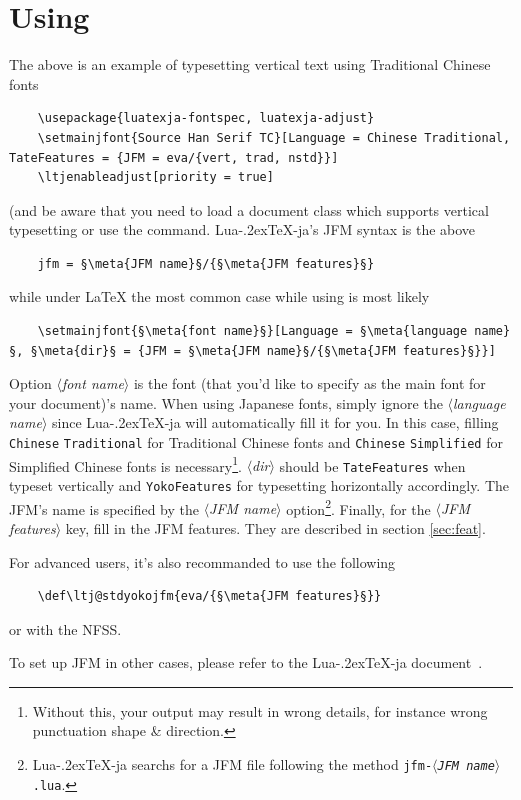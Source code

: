 \documentclass[twoside]{article}
\def\meta#1{{\normalfont\rmfamily\itshape$\langle$#1\/$\rangle$}}
\def\LuaTeX{Lua\kern-.2ex\TeX}
\begin{document}
\section{Using}
The above is an example of typesetting vertical text using Traditional Chinese fonts
\begin{lstlisting}
    \usepackage{luatexja-fontspec, luatexja-adjust}
    \setmainjfont{Source Han Serif TC}[Language = Chinese Traditional, TateFeatures = {JFM = eva/{vert, trad, nstd}}]
    \ltjenableadjust[priority = true]
\end{lstlisting}
(and be aware that you need to load a document class which supports vertical typesetting or use the \texttt{\string\tate} command. \LuaTeX-ja's JFM syntax is the above
\begin{lstlisting}
    jfm = §\meta{JFM name}§/{§\meta{JFM features}§}
\end{lstlisting}
while under {\LaTeX} the most common case while using \texttt{\string\setmainjfont} is most likely
\begin{lstlisting}
    \setmainjfont{§\meta{font name}§}[Language = §\meta{language name}§, §\meta{dir}§ = {JFM = §\meta{JFM name}§/{§\meta{JFM features}§}}]
\end{lstlisting}
Option \meta{font name} is the font (that you'd like to specify as the main font for your document)'s name. When using Japanese fonts, simply ignore the \meta{language name} since \LuaTeX-ja will automatically fill it for you. In this case, filling \texttt{Chinese} \texttt{Traditional} for Traditional Chinese fonts and \texttt{Chinese} \texttt{Simplified} for Simplified Chinese fonts is necessary\footnote{Without this, your output may result in wrong details, for instance wrong punctuation shape \& direction.}. \meta{dir} should be \texttt{TateFeatures} when typeset vertically and \texttt{YokoFeatures} for typesetting horizontally accordingly. The JFM's name is specified by the \meta{JFM name} option\footnote{\LuaTeX-ja searchs for a JFM file following the method \texttt{jfm-\meta{JFM name}.lua}.}. Finally, for the \meta{JFM features} key, fill in the JFM features. They are described in section \ref{sec:feat}.\par
For advanced users, it's also recommanded to use the following
\begin{lstlisting}
    \def\ltj@stdyokojfm{eva/{§\meta{JFM features}§}}
\end{lstlisting}
or with the NFSS.\par
To set up JFM in other cases, please refer to the \LuaTeX-ja document~\cite{luatexja-doc}.
\end{document}
